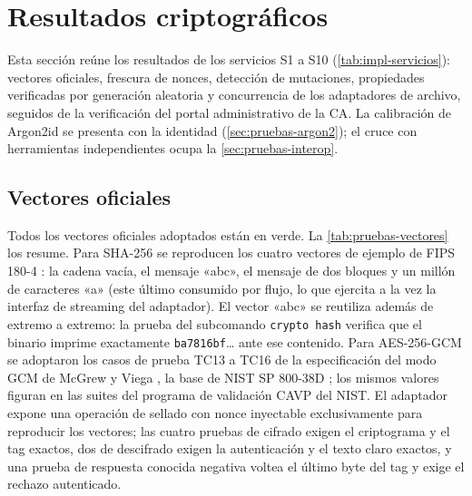 
\section{Resultados criptográficos}\label{sec:pruebas-cripto}

Esta sección reúne los resultados de los servicios S1 a S10 (\cref{tab:impl-servicios}): vectores oficiales, frescura de nonces, detección de mutaciones, propiedades verificadas por generación aleatoria y concurrencia de los adaptadores de archivo, seguidos de la verificación del portal administrativo de la CA. La calibración de Argon2id se presenta con la identidad (\cref{sec:pruebas-argon2}); el cruce con herramientas independientes ocupa la \cref{sec:pruebas-interop}.

\subsection{Vectores oficiales}\label{sec:pruebas-vectores}

Todos los vectores oficiales adoptados están en verde. La \cref{tab:pruebas-vectores} los resume. Para SHA-256 se reproducen los cuatro vectores de ejemplo de FIPS 180-4 \cite{nist2015fips1804}: la cadena vacía, el mensaje «abc», el mensaje de dos bloques y un millón de caracteres «a» (este último consumido por flujo, lo que ejercita a la vez la interfaz de streaming del adaptador). El vector «abc» se reutiliza además de extremo a extremo: la prueba del subcomando \texttt{crypto hash} verifica que el binario imprime exactamente \texttt{ba7816bf}\ldots{} ante ese contenido. Para AES-256-GCM se adoptaron los casos de prueba TC13 a TC16 de la especificación del modo GCM de McGrew y Viega \cite{mcgrewviega2004}, la base de NIST SP 800-38D \cite{dworkin2007}; los mismos valores figuran en las suites del programa de validación CAVP del NIST. El adaptador expone una operación de sellado con nonce inyectable exclusivamente para reproducir los vectores; las cuatro pruebas de cifrado exigen el criptograma y el tag exactos, dos de descifrado exigen la autenticación y el texto claro exactos, y una prueba de respuesta conocida negativa voltea el último byte del tag y exige el rechazo autenticado.

